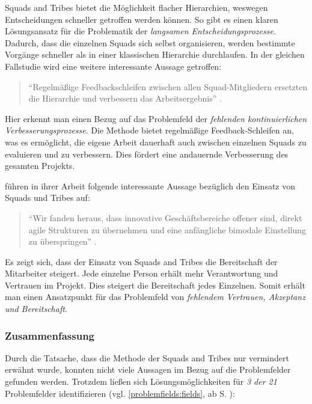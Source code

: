 Squads and Tribes bietet die Möglichkeit flacher Hierarchien, weswegen Entscheidungen schneller getroffen werden können. So gibt es einen klaren Lösungsansatz für die Problematik der \textit{langsamen Entscheidungsprozesse}. Dadurch, dass die einzelnen Squads sich selbst organisieren, werden bestimmte Vorgänge schneller als in einer klassischen Hierarchie durchlaufen. In der gleichen Fallstudie wird eine weitere interessante  Aussage getroffen:

\begin{quote}
	``Regelmäßige Feedbackschleifen zwischen allen Squad-Mitgliedern ersetzten die Hierarchie und verbessern das Arbeitsergebnis'' \cite[S. 98]{heinemann_digitale_2016}.
\end{quote}

Hier erkennt man einen Bezug auf das Problemfeld der \textit{fehlenden kontinuierlichen Verbesserungsprozesse}. Die Methode bietet regelmäßige Feedback-Schleifen an, was es ermöglicht, die eigene Arbeit dauerhaft auch zwischen einzelnen Squads zu evaluieren und zu verbessern. Dies fördert eine andauernde Verbesserung des gesamten Projekts.

 führen in ihrer Arbeit folgende interessante Aussage bezüglich den Einsatz von Squads und Tribes auf:

\begin{quote}
	``Wir fanden heraus, dass innovative Geschäftsbereiche offener sind, direkt agile Strukturen zu übernehmen und eine anfängliche bimodale Einstellung zu überspringen'' \cite[S. 9]{gerster_how_2019}.
\end{quote}

Es zeigt sich, dass der Einsatz von Squads and Tribes die Bereitschaft der Mitarbeiter steigert. Jede einzelne Person erhält mehr Verantwortung und Vertrauen im Projekt. Dies steigert die Bereitschaft jedes Einzelnen. Somit erhält man einen Ansatzpunkt für das Problemfeld von \textit{fehlendem Vertrauen, Akzeptanz und Bereitschaft}.

\subsubsection{Zusammenfassung}

Durch die Tatsache, dass die Methode der Squads and Tribes nur vermindert erwähnt wurde, konnten nicht viele Aussagen im Bezug auf die Problemfelder gefunden werden. Trotzdem ließen sich Lösungsmöglichkeiten für \textit{3 der 21} Problemfelder identifizieren (vgl. \ref{problemfields:fields}, ab S. \pageref{problemfields:fields}):

